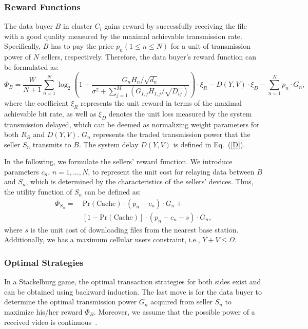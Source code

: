 \documentclass[11pt,draftcls]{IEEEtran}{\onecolumn}
\begin{document}
\subsubsection{Reward Functions}

The data buyer $B$ in cluster $C_{i}$ gains reward by successfully receiving the file with a good quality measured by the maximal achievable transmission rate. Specifically, $B$ has to pay the price $p_n (1 \leq n \leq N)$ for a unit of transmission power of $N$ sellers, respectively. Therefore, the data buyer's reward function can be formulated as:
\begin{equation}\label{PhiB-multiple}
\Phi_B\!=\!\frac{W}{N+1}\sum_{n=1}^N \log_2\left(1\!+\!\frac{{{G}_{n}}H_{n}/\sqrt{{{d}_{n}}}}{{{\sigma }^{2}}+\sum\limits_{j=1}^{M}{({G_{I,j}}H_{I,j}/\sqrt{{{D}_{ij}}})}}\right)\cdot \xi_R-D(Y,V)\cdot\xi_D
-\sum_{n=1}^N p_n\cdot G_n,
\end{equation}
where the coefficient $\xi_R$ represents the unit reward in terms of the maximal achievable bit rate, as well as $\xi_D$ denotes the unit loss measured by the system transmission delayed, which can be deemed as normalizing weight parameters for both $R_B$ and $D(Y,V)$. $G_n$ represents the traded transmission power that the seller $S_n$ transmits to $B$. The system delay $D(Y,V)$ is defined in Eq.~(\ref{D}).

In the following, we formulate the sellers' reward function. We introduce parameters $c_n$, $n=1,\ldots,N$, to represent the unit cost for relaying data between $B$ and $S_n$, which is determined by the characteristics of the sellers' devices. Thus, the utility function of $S_n$ can be defined as:
\begin{equation}\label{PhiS}
\begin{aligned}
\Phi_{S_n}=~&\textrm{Pr}(\textrm{Cache})\cdot(p_n-c_n)\cdot G_n+ \\
&\left[1-\textrm{Pr}(\textrm{Cache})\right]\cdot(p_n-c_n-s)\cdot G_n,
\end{aligned}
\end{equation}
where $s$ is the unit cost of downloading files from the nearest base station.
Additionally, we has a maximum cellular users constraint, i.e., $Y+V \leq \Omega$.
\subsubsection{Optimal Strategies}

In a Stackelburg game, the optimal transaction strategies for both sides exist and can be obtained using backward induction. The last move is for the data buyer to determine the optimal transmission power $G_n$ acquired from seller $S_n$ to maximize his/her reward $\Phi_B$. Moreover, we assume that the possible power of a received video is continuous~\cite{15}.
\end{document}
